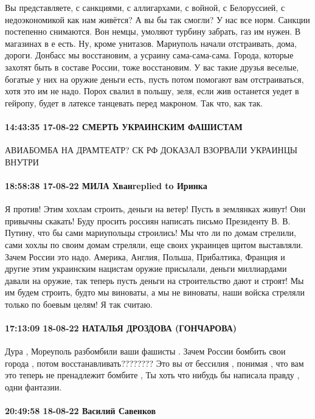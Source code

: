 Вы представляете, с санкциями, с аллигархами, с войной, с Белоруссией, с
недоэкономикой как нам живётся? А вы бы так смогли? У нас все норм. Санкции
постепенно снимаются. Вон немцы, умоляют турбину забрать, газ им нужен. В
магазинах в е есть. Ну, кроме унитазов. Мариуполь начали отстраивать, дома,
дороги. Донбасс мы восстановим, а усраину сама-сама-сама. Города, которые
захотят быть в составе России, тоже восстановим. У вас такие друзья веселые,
богатые у них на оружие деньги есть, пусть потом помогают вам отстраиваться,
хотя это им не надо. Порох свалил в польшу, зеля, если жив останется уедет в
гейропу, будет в латексе танцевать перед макроном. Так что, как так.

\paragraph{14:43:35 17-08-22 СМЕРТЬ УКРАИНСКИМ ФАШИСТАМ}

АВИАБОМБА НА ДРАМТЕАТР? СК РФ ДОКАЗАЛ ВЗОРВАЛИ УКРАИНЦЫ ВНУТРИ

\paragraph{18:58:38 17-08-22 МИЛА Хванreplied to Иринка}

Я против! Этим хохлам строить, деньги на ветер! Пусть в землянках живут! Они
привычны скакать! Буду просить россиян написать письмо Президенту В. В. Путину,
что бы сами мариупольцы строились! Мы что ли по домам стрелили, сами хохлы по
своим домам стреляли, еще своих украинцев щитом выставляли. Зачем России это
надо. Америка, Англия, Польша, Прибалтика, Франция и другие этим украинским
нацистам оружие присылали, деньги миллиардами давали на оружие, так теперь
пусть деньги на строительство дают и строят! Мы им будем строить, будто мы
виноваты, а мы не виноваты, наши войска стреляли только по боевым целям! Я так
считаю.

\paragraph{17:13:09 18-08-22 НАТАЛЬЯ ДРОЗДОВА (ГОНЧАРОВА)}

Дура , Мореуполь разбомбили ваши фашисты .
Зачем России бомбить свои города , потом восстанавливать????????
Это вы от бессилия , понимая , что вам это теперь не пренадлежит бомбите ,
Ты хоть что нибудь бы написала правду , одни фантазии.

\paragraph{20:49:58 18-08-22 Василий Савенков}


